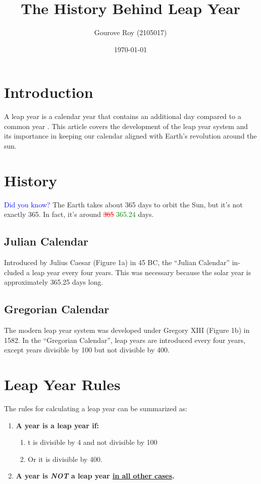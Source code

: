 \documentclass{article}
\title{The History Behind Leap Year}
\author{Gourove Roy (2105017)}
\date{\today}
\begin{document}
\maketitle
\section{Introduction}
A leap year is a calendar year that contains an additional day compared to a
common year \cite{1}. This article covers the development of the leap year system and
its importance in keeping our calendar aligned with Earth’s revolution around
the sun.

\section{History}
\textcolor{blue}{Did you know?} The Earth takes about 365 days to orbit the Sun, but it’s not exactly 365. In fact, it’s around \textcolor{red}{\sout{365}} \textcolor{green}{365.24} days.

\subsection{Julian Calendar}
Introduced by Julius Caesar (Figure 1a) in 45 BC, the “Julian Calendar” in-
cluded a leap year every four years. This was necessary because the solar year
is approximately 365.25 days long.

\subsection{Gregorian Calendar}
The modern leap year system was developed under Gregory XIII (Figure 1b) in
1582. In the “Gregorian Calendar”, leap years are introduced every four years,
except years divisible by 100 but not divisible by 400.

\section{Leap Year Rules}
The rules for calculating a leap year can be summarized as:
\begin{enumerate}
    \item \textbf{A year is a leap year if:}
        \begin{enumerate}
            \item t is divisible by 4 and not divisible by 100
            \item Or it is divisible by 400.
        \end{enumerate}
    \item \textbf{A year is \textit{NOT} a leap year \underline{in all other cases}.}
\end{enumerate}
\end{document}
